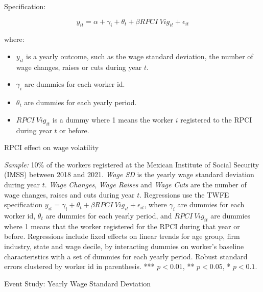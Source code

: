 \documentclass[oneside,11pt]{article}
\begin{document}
Specification:

$$y_{it} = \alpha + \gamma_{i} + \theta_{t} + \beta RPCI\ Vig_{it} + \epsilon_{it}$$

where:

\begin{itemize}
    \item $y_{it}$ is a yearly outcome, such as the wage standard deviation, the number of wage changes, raises or cuts during year $t$.
    \item $\gamma_{i}$ are dummies for each worker id.
    \item $\theta_{t}$ are dummies for each yearly period.
    \item $RPCI\ Vig_{it}$ is a dummy where 1 means the worker $i$ registered to the RPCI during year $t$ or before.
\end{itemize}

\begin{table}[H]
    \caption{RPCI effect on wage volatility}
    \label{sal_cierre_sd_rpci}
    \begin{center}
    \scriptsize{}
    \end{center}
\end{table}

\scriptsize{
\noindent \textit{Sample:} 10\% of the workers registered at the Mexican Institute of Social Security (IMSS) between 2018 and 2021. \textit{Wage SD} is the yearly wage standard deviation during year $t$. \textit{Wage Changes}, \textit{Wage Raises} and \textit{Wage Cuts} are the number of wage changes, raises and cuts during year $t$. Regressions use the TWFE specification $y_{it} = \gamma_{i} + \theta_{t}+ \beta RPCI\ Vig_{it} +\epsilon_{it}$, where $\gamma_{i}$ are dummies for each worker id, $\theta_{t}$ are dummies for each yearly period, and $RPCI\ Vig_{it}$ are dummies where 1 means that the worker registered for the RPCI during that year or before. Regressions include fixed effects on linear trends for age group, firm industry, state and wage decile, by interacting dummies on worker's baseline characteristics with a set of dummies for each yearly period. Robust standard errors clustered by worker id in parenthesis. *** $p<0.01$, ** $p<0.05$, * $p<0.1$.}

\normalsize

\clearpage

Event Study: Yearly Wage Standard Deviation
\end{document}
